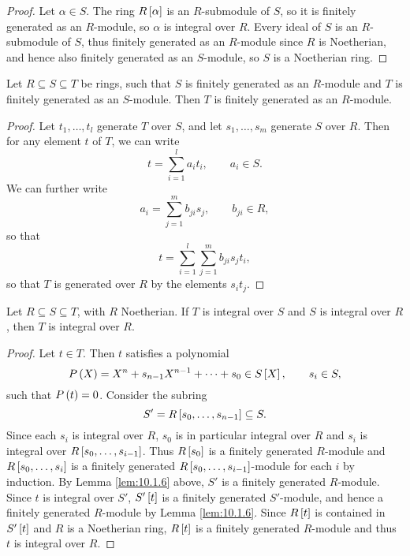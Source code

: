 \begin{proof}
Let $ \alpha \in S $. The ring $ R\sb{\alpha} $ is an $ R $-submodule of $ S $, so it is finitely generated as an $ R $-module, so $ \alpha $ is integral over $ R $. Every ideal of $ S $ is an $ R $-submodule of $ S $, thus finitely generated as an $ R $-module since $ R $ is Noetherian, and hence also finitely generated as an $ S $-module, so $ S $ is a Noetherian ring.
\end{proof}

\pagebreak

\begin{lemma}
\label{lem:10.1.6}
Let $ R \subseteq S \subseteq T $ be rings, such that $ S $ is finitely generated as an $ R $-module and $ T $ is finitely generated as an $ S $-module. Then $ T $ is finitely generated as an $ R $-module.
\end{lemma}

\begin{proof}
Let $ t_1, \dots, t_l $ generate $ T $ over $ S $, and let $ s_1, \dots, s_m $ generate $ S $ over $ R $. Then for any element $ t $ of $ T $, we can write
$$ t = \sum_{i = 1}^l a_it_i, \qquad a_i \in S. $$
We can further write
$$ a_i = \sum_{j = 1}^m b_{ji}s_j, \qquad b_{ji} \in R, $$
so that
$$ t = \sum_{i = 1}^l \sum_{j = 1}^m b_{ji}s_jt_i, $$
so that $ T $ is generated over $ R $ by the elements $ s_it_j $.
\end{proof}

\begin{corollary}
Let $ R \subseteq S \subseteq T $, with $ R $ Noetherian. If $ T $ is integral over $ S $ and $ S $ is integral over $ R $, then $ T $ is integral over $ R $.
\end{corollary}

\begin{proof}
Let $ t \in T $. Then $ t $ satisfies a polynomial
$$ P\rb{X} = X^n + s_{n - 1}X^{n - 1} + \dots + s_0 \in S\sb{X}, \qquad s_i \in S, $$
such that $ P\rb{t} = 0 $. Consider the subring
$$ S' = R\sb{s_0, \dots, s_{n - 1}} \subseteq S. $$
Since each $ s_i $ is integral over $ R $, $ s_0 $ is in particular integral over $ R $ and $ s_i $ is integral over $ R\sb{s_0, \dots, s_{i - 1}} $. Thus $ R\sb{s_0} $ is a finitely generated $ R $-module and $ R\sb{s_0, \dots, s_i} $ is a finitely generated $ R\sb{s_0, \dots, s_{i - 1}} $-module for each $ i $ by induction. By Lemma \ref{lem:10.1.6} above, $ S' $ is a finitely generated $ R $-module. Since $ t $ is integral over $ S' $, $ S'\sb{t} $ is a finitely generated $ S' $-module, and hence a finitely generated $ R $-module by Lemma \ref{lem:10.1.6}. Since $ R\sb{t} $ is contained in $ S'\sb{t} $ and $ R $ is a Noetherian ring, $ R\sb{t} $ is a finitely generated $ R $-module and thus $ t $ is integral over $ R $.
\end{proof}

